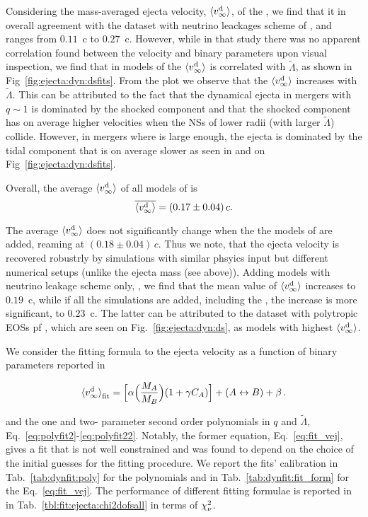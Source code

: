 Considering the mass-averaged ejecta velocity, $\langle v^{\text{d}}_\infty\rangle$, of the \DSrefset{}, we find that it in 
overall agreement with the dataset with neutrino leackages scheme of \citet{Radice:2018pdn}, and ranges from $0.11$~c to $0.27$~c. However, while in that study there was no apparent correlation found 
between the velocity and binary parameters upon visual inspection, we find that in models of \DSrefset{}
the $\langle v^{\text{d}}_\infty\rangle$ is correlated with $\tilde{\Lambda}$, as shown in Fig~\ref{fig:ejecta:dyn:dsfits}.
From the plot we observe that the $\langle v^{\text{d}}_\infty\rangle$ increases with $\tilde{\Lambda}$. This can be attributed to
the fact that the dynamical ejecta in mergers with $q\sim1$ is dominated by the shocked component 
and that the shocked component has on average higher velocities when the \acp{NS} of lower radii 
(with larger $\tilde{\Lambda}$) collide.
However, in mergers where \mr{} is large enough, the ejecta is dominated by the tidal component that 
is on average slower as seen in \DSrefset{} and on Fig~\ref{fig:ejecta:dyn:dsfits}.

Overall, the average $\langle v^{\text{d}}_\infty\rangle$ of all models of \DSrefset{} is 
\begin{equation}
\label{eq:ejecta:dyn:avg:v}
\overline{\langle v^{\text{d}}_\infty\rangle} = (0.17\pm0.04)\,c . 
\end{equation}

The average $\langle v^{\text{d}}_\infty\rangle$ does not significantly change when the the models of \DSheatcool{} are added,
reaming at $(0.18 \pm 0.04) \, c$.
Thus we note, that the ejecta velocity is recovered robustrly by simulations with 
similar phsyics input but different numerical setups (unlike the ejecta mass (see above)).
Adding models with neutrino leakage scheme only, \DScool{}, we find that the mean value of $\langle v^{\text{d}}_\infty\rangle$
increases to $0.19$~c, while if all the simulations are added, including the \DSnone{}, the 
increase is more significant, to $0.23$~c.
The latter can be attributed to the dataset with polytropic \acp{EOS} pf \citet{Bauswein:2013yna}, 
which are seen on  Fig.~\ref{fig:ejecta:dyn:ds}, as models with highest $\langle v^{\text{d}}_\infty\rangle$.

We consider the fitting formula to the ejecta velocity as a function of binary parameters 
reported in \citet{Dietrich:2016hky,Radice:2018pdn}

\begin{equation}
{\langle v^{\text{d}}_\infty\rangle}_{\rm fit} = \Big[\alpha\Big(\frac{M_A}{M_B}\Big)(1+\gamma C_A)\Big] + (A\leftrightarrow B) + \beta
\label{eq:fit_vej} \, .
\end{equation}

and the one and two- parameter second order polynomials in $q$ and $\tilde{\Lambda}$, Eq.~\eqref{eq:polyfit2}-\eqref{eq:polyfit22}.
Notably, the former equation, Eq.~\eqref{eq:fit_vej}, gives a fit that is not well constrained 
and was found to depend on the choice of the initial guesses for the fitting procedure.
We report the fits' calibration in Tab.~\ref{tab:dynfit:poly} for the polynomials and 
in Tab.~\ref{tab:dynfit:fit_form} for the Eq.~\eqref{eq:fit_vej}.
The performance of different fitting formulae is reported in  in Tab.~\ref{tbl:fit:ejecta:chi2dofsall}
in terms of $\chi_{\nu}^2$.

